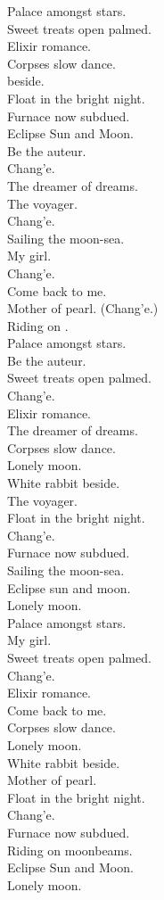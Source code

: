 Palace amongst stars. \\
Sweet treats open palmed. \\
Elixir romance. \\
Corpses slow dance. \\
 beside. \\
Float in the bright night. \\
Furnace now subdued. \\
Eclipse Sun and Moon. \\

Be the auteur. \\
Chang'e. \\
The dreamer of dreams. \\
The voyager. \\
Chang'e. \\
Sailing the moon-sea. \\
My girl. \\
Chang'e. \\
Come back to me. \\
Mother of pearl. (Chang'e.) \\
Riding on . \\

Palace amongst stars. \\
Be the auteur. \\
Sweet treats open palmed. \\
Chang'e. \\
Elixir romance. \\
The dreamer of dreams. \\
Corpses slow dance. \\
Lonely moon. \\
White rabbit beside. \\
The voyager. \\
Float in the bright night. \\
Chang'e. \\
Furnace now subdued. \\
Sailing the moon-sea. \\
Eclipse sun and moon. \\
Lonely moon. \\

Palace amongst stars. \\
My girl. \\
Sweet treats open palmed. \\
Chang'e. \\
Elixir romance. \\
Come back to me. \\
Corpses slow dance. \\
Lonely moon. \\
White rabbit beside. \\
Mother of pearl. \\
Float in the bright night. \\
Chang'e. \\
Furnace now subdued. \\
Riding on moonbeams. \\
Eclipse Sun and Moon. \\
Lonely moon. \\

